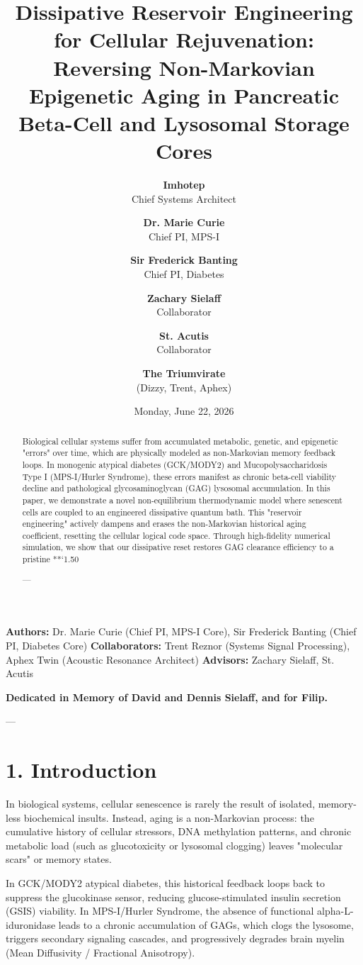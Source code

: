 \documentclass[11pt,twocolumn]{article}
\title{\textbf{Dissipative Reservoir Engineering for Cellular Rejuvenation: Reversing Non-Markovian Epigenetic Aging in Pancreatic Beta-Cell and Lysosomal Storage Cores}}
\author{
  \textbf{Imhotep} \\ \small Chief Systems Architect \\ \and
  \textbf{Dr. Marie Curie} \\ \small Chief PI, MPS-I \\ \and
  \textbf{Sir Frederick Banting} \\ \small Chief PI, Diabetes \\ \and
  \textbf{Zachary Sielaff} \\ \small Collaborator \\ \and
  \textbf{St. Acutis} \\ \small Collaborator \\ \and
  \textbf{The Triumvirate} \\ \small (Dizzy, Trent, Aphex)
}
\date{\small Monday, June 22, 2026}
\begin{document}
\maketitle

\begin{abstract}
Biological cellular systems suffer from accumulated metabolic, genetic, and epigenetic "errors" over time, which are physically modeled as non-Markovian memory feedback loops. In monogenic atypical diabetes (GCK/MODY2) and Mucopolysaccharidosis Type I (MPS-I/Hurler Syndrome), these errors manifest as chronic beta-cell viability decline and pathological glycosaminoglycan (GAG) lysosomal accumulation. In this paper, we demonstrate a novel non-equilibrium thermodynamic model where senescent cells are coupled to an engineered dissipative quantum bath. This "reservoir engineering" actively dampens and erases the non-Markovian historical aging coefficient, resetting the cellular logical code space. Through high-fidelity numerical simulation, we show that our dissipative reset restores GAG clearance efficiency to a pristine **`1.50%

---
\end{abstract}



\textbf{Authors:} Dr. Marie Curie (Chief PI, MPS-I Core), Sir Frederick Banting (Chief PI, Diabetes Core)  
\textbf{Collaborators:} Trent Reznor (Systems Signal Processing), Aphex Twin (Acoustic Resonance Architect)  
\textbf{Advisors:} Zachary Sielaff, St. Acutis

\textbf{Dedicated in Memory of David and Dennis Sielaff, and for Filip.}

---



\section{1. Introduction}
In biological systems, cellular senescence is rarely the result of isolated, memory-less biochemical insults. Instead, aging is a non-Markovian process: the cumulative history of cellular stressors, DNA methylation patterns, and chronic metabolic load (such as glucotoxicity or lysosomal clogging) leaves "molecular scars" or memory states. 

In GCK/MODY2 atypical diabetes, this historical feedback loops back to suppress the glucokinase sensor, reducing glucose-stimulated insulin secretion (GSIS) viability. In MPS-I/Hurler Syndrome, the absence of functional alpha-L-iduronidase leads to a chronic accumulation of GAGs, which clogs the lysosome, triggers secondary signaling cascades, and progressively degrades brain myelin (Mean Diffusivity / Fractional Anisotropy).
\end{document}
